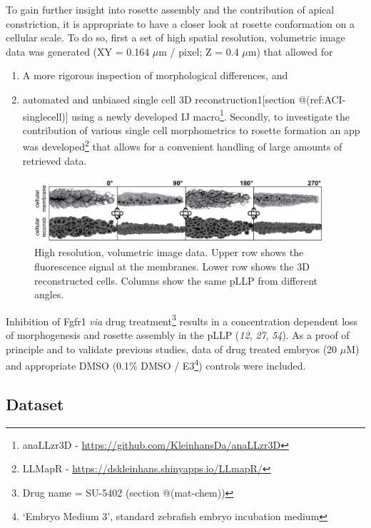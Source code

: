 \documentclass[11pt,singlespacinge,twoside]{reedthesis} %
\providecommand{\tightlist}{%
  \setlength{\itemsep}{0pt}\setlength{\parskip}{0pt}}
\def\labelenumi{\arabic{enumi}.}
\begin{document}
To gain further insight into rosette assembly and the contribution of apical constriction, it is appropriate to have a closer look at rosette conformation on a cellular scale. To do so, first a set of high spatial resolution, volumetric image data was generated (XY = 0.164 \(\mu\)m / pixel; Z = 0.4 \(\mu\)m) that allowed for
\begin{enumerate}
\def\labelenumi{\arabic{enumi}.}
\tightlist
\item
  A more rigorous inspection of morphological differences, and
\item
  automated and unbiased single cell 3D reconstruction1{[}section @(ref:ACI-singlecell){]} using a newly developed IJ macro\footnote{anaLLzr3D - \url{https://github.com/KleinhansDa/anaLLzr3D}}. Secondly, to investigate the contribution of various single cell morphometrics to rosette formation an app was developed\footnote{LLMapR - \url{https://dskleinhans.shinyapps.io/LLmapR/}} that allows for a convenient handling of large amounts of retrieved data.
\end{enumerate}

\begin{figure}

{\centering \includegraphics[width=0.95\textwidth]{figures/results/04_constriction/reconstriction_data} 

}

\caption[High resolution, volumetric image data]{High resolution, volumetric image data. Upper row shows the fluorescence signal at the membranes. Lower row shows the 3D reconstructed cells. Columns show the same pLLP from different angles.}\label{fig:acdata}
\end{figure}
Inhibition of Fgfr1 \emph{via} drug treatment\footnote{Drug name = SU-5402 (section @(mat-chem))} results in a concentration dependent loss of morphogenesis and rosette assembly in the pLLP (\emph{12}, \emph{27}, \emph{54}). As a proof of principle and to validate previous studies, data of drug treated embryos (20 \(\mu\)M) and appropriate DMSO (0.1\(\%\) DMSO / E3\footnote{`Embryo Medium 3', standard zebrafish embryo incubation medium}) controls were included.

\hypertarget{dataset-3}{%
\subsection{Dataset}\label{dataset-3}}
\end{document}

